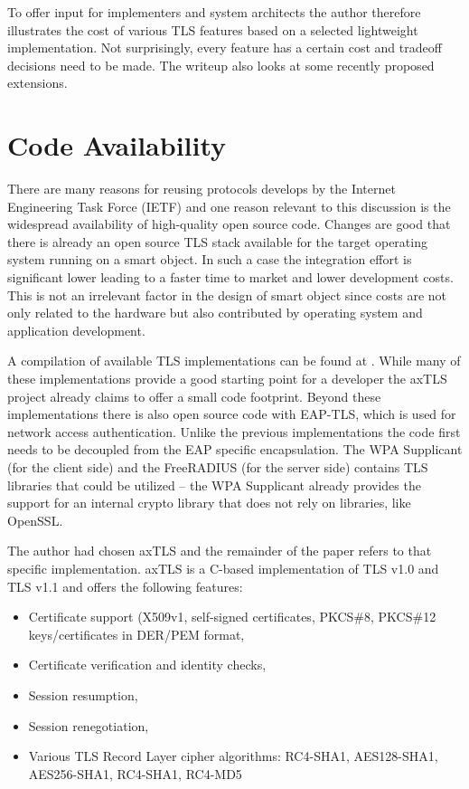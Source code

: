 \documentclass[a4paper, 10pt]{IEEEtran}
\begin{document}
To offer input for implementers and system architects the author therefore illustrates the cost of various TLS features based on a selected lightweight implementation. Not surprisingly, every feature has a certain cost and tradeoff decisions need to be made. The writeup also looks at some recently proposed extensions. 

\section{Code Availability}

There are many reasons for reusing protocols develops by the Internet Engineering Task Force (IETF) and one reason relevant to this discussion is the widespread availability of high-quality open source code. Changes are good that there is already an open source TLS stack available for the target operating system running on a smart object. In such a case the integration effort is significant lower leading to a faster time to market and lower development costs. This is not an irrelevant factor in the design of smart object since costs are not only related to the hardware but also contributed by operating system and application development. 

A compilation of available TLS implementations can be found at \cite{TLS-Implementations}. While many of these implementations provide a good starting point for a developer the axTLS project \cite{axTLS} already claims to offer a small code footprint. Beyond these implementations there is also open source code with EAP-TLS, which is used for network access authentication. Unlike the previous implementations the code first needs to be decoupled from the EAP specific encapsulation. The WPA Supplicant \cite{wpa-supplicant} (for the client side) and the FreeRADIUS \cite{FreeRADIUS} (for the server side) contains TLS libraries that could be utilized -- the WPA Supplicant already provides the support for an internal crypto library that does not rely on libraries, like OpenSSL. 

The author had chosen axTLS and the remainder of the paper refers to that specific implementation. axTLS is a C-based implementation of TLS v1.0 and TLS v1.1 and offers the following features: 
\begin{itemize}
\item Certificate support (X509v1, self-signed certificates, PKCS\#8, PKCS\#12 keys/certificates in DER/PEM format, 
\item Certificate verification and identity checks, 
\item Session resumption,
\item Session renegotiation,
\item Various TLS Record Layer cipher algorithms: RC4-SHA1, AES128-SHA1, AES256-SHA1,  RC4-SHA1, RC4-MD5
\end{itemize}
\end{document}
